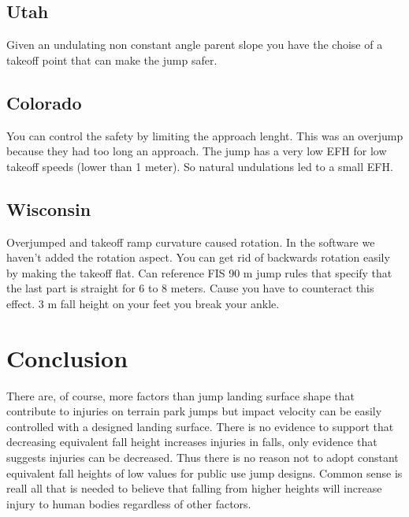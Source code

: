 \documentclass{article}
\begin{document}
\subsection{Utah}
Given an undulating non constant angle parent slope you have the choise of a takeoff point that can make the jump safer.
\subsection{Colorado}
You can control the safety by limiting the approach lenght. This was an overjump because they had too long an approach.
The jump has a very low EFH for low takeoff speeds (lower than 1 meter). So natural undulations led to a small EFH.
\subsection{Wisconsin}
Overjumped and takeoff ramp curvature caused rotation. In the software we haven't added the rotation aspect. You can get rid of backwards rotation easily by making the takeoff flat. Can reference FIS 90 m jump rules that specify that the last part is straight for 6 to 8 meters. Cause you have to counteract this effect. 3 m fall height on your feet you break your ankle.

\section{Conclusion}
%
There are, of course, more factors than jump landing surface shape that
contribute to injuries on terrain park jumps but impact velocity can be easily
controlled with a designed landing surface. There is no evidence to support
that decreasing equivalent fall height increases injuries in falls, only
evidence that suggests injuries can be decreased. Thus there is no reason not
to adopt constant equivalent fall heights of low values for public use jump
designs. Common sense is reall all that is needed to believe that falling from
higher heights will increase injury to human bodies regardless of other
factors.



\end{document}
